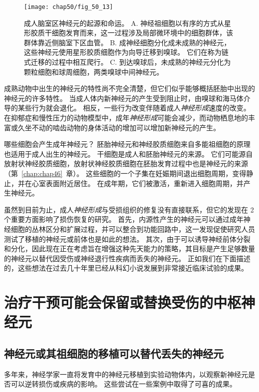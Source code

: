 \begin{figure}[htbp]
	\centering
	\texttt{[image: chap50/fig\_50\_13]}
	\caption{成人脑室区神经元的起源和命运\cite{tavazoie2008specialized}。
		A. 神经祖细胞以有序的方式从星形胶质干细胞发育而来，这一过程涉及局部微环境中的细胞群体，该群体靠近侧脑室下区血管。
		B. 成神经细胞分化成未成熟的神经元，这些神经元使用星形胶质细胞作为向导迁移到嗅球。
		它们在称为链式迁移的过程中相互爬行。
		C. 到达嗅球后，未成熟的神经元分化为颗粒细胞和球周细胞，两类嗅球中间神经元。}
	\label{fig:50_13}
\end{figure}


成熟动物中出生的神经元的特性尚不完全清楚，但它们似乎能够概括胚胎中出现的神经元的许多特性。
当成人体内新神经元的产生受到阻止时，由嗅球和海马体介导的某些行为就会退化。
相反，一些行为改变伴随着成人\textit{神经形成}速度的改变。
在抑郁症和慢性压力的动物模型中，成年\textit{神经形成}可能会减少，而动物栖息地的丰富或久坐不动的啮齿动物的身体活动的增加可以增加新神经元的产生。


哪些细胞会产生成年神经元？
胚胎神经元和神经胶质细胞来自多能祖细胞的原理也适用于成人出生的神经元。
干细胞是成人和胚胎神经元的来源。
它们可能源自放射状神经胶质细胞，放射状神经胶质细胞在胚胎发育过程中也是神经元的来源（第~\ref{chap:chap46}~章）。
这些细胞的一个子集在妊娠期间退出细胞周期，变得静止，并在心室表面附近居住。
在成年期，它们被激活，重新进入细胞周期，并产生神经元。


虽然到目前为止，成人\textit{神经形成}与受损组织的修复没有直接联系，但它的发现在 2 个重要方面影响了损伤恢复的研究。
首先，内源性产生的神经元可以通过成年神经细胞的丛林区分和扩展过程，并可以整合到功能回路中，这一发现促使研究人员测试了移植的神经元或前体也是如此的想法。
其次，由于可以诱导神经前体分裂和分化，因此现在正在考虑旨在增强这种先天能力的策略，其目标是产生足够数量的神经元以替代因受伤或神经退行性疾病而丢失的神经元。
正如我们在下面描述的，这些想法在过去几十年里已经从科幻小说发展到非常接近临床试验的成果。



\section{治疗干预可能会保留或替换受伤的中枢神经元}

\subsection{神经元或其祖细胞的移植可以替代丢失的神经元}

多年来，神经学家一直将发育中的神经元移植到实验动物体内，以观察新神经元是否可以逆转损伤或疾病的影响。
这些尝试在一些案例中取得了可喜的成果。


